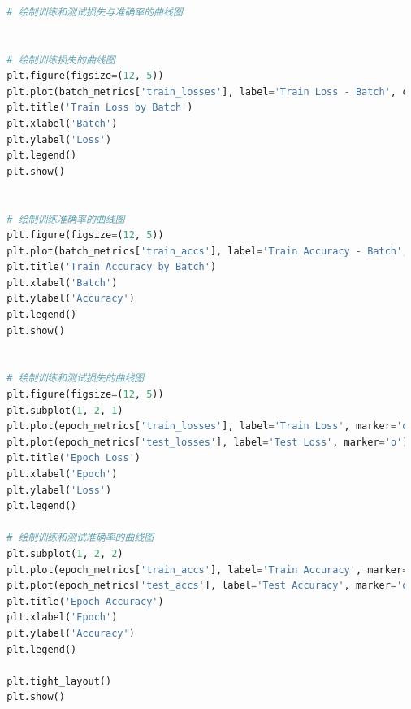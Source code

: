 \documentclass[12pt]{article}
\begin{document}
\begin{lstlisting}[language=Python]
  
  
  
  # 绘制训练和测试损失与准确率的曲线图
  
  
  # 绘制训练损失的曲线图
  plt.figure(figsize=(12, 5))
  plt.plot(batch_metrics['train_losses'], label='Train Loss - Batch', color='blue')
  plt.title('Train Loss by Batch')
  plt.xlabel('Batch')
  plt.ylabel('Loss')
  plt.legend()
  plt.show()
  
  
  # 绘制训练准确率的曲线图
  plt.figure(figsize=(12, 5))
  plt.plot(batch_metrics['train_accs'], label='Train Accuracy - Batch', color='green')
  plt.title('Train Accuracy by Batch')
  plt.xlabel('Batch')
  plt.ylabel('Accuracy')
  plt.legend()
  plt.show()
  
  
  # 绘制训练和测试损失的曲线图
  plt.figure(figsize=(12, 5))
  plt.subplot(1, 2, 1)
  plt.plot(epoch_metrics['train_losses'], label='Train Loss', marker='o')
  plt.plot(epoch_metrics['test_losses'], label='Test Loss', marker='o')
  plt.title('Epoch Loss')
  plt.xlabel('Epoch')
  plt.ylabel('Loss')
  plt.legend()
  
  # 绘制训练和测试准确率的曲线图
  plt.subplot(1, 2, 2)
  plt.plot(epoch_metrics['train_accs'], label='Train Accuracy', marker='o')
  plt.plot(epoch_metrics['test_accs'], label='Test Accuracy', marker='o')
  plt.title('Epoch Accuracy')
  plt.xlabel('Epoch')
  plt.ylabel('Accuracy')
  plt.legend()
  
  plt.tight_layout()
  plt.show()
\end{lstlisting}
\end{document}
